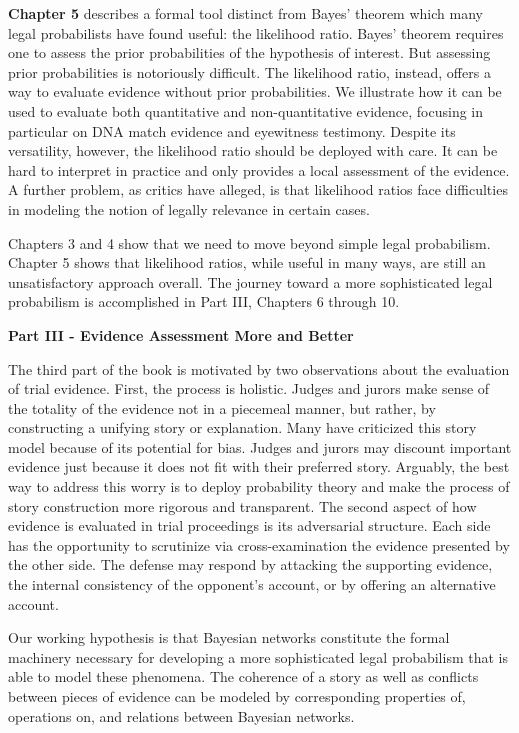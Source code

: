 \documentclass[
  10pt,
  dvipsnames,enabledeprecatedfontcommands]{scrartcl}
\begin{document}
\textbf{Chapter 5} describes a formal tool distinct from Bayes' theorem
which many legal probabilists have found useful: the likelihood ratio.
Bayes' theorem requires one to assess the prior probabilities of the
hypothesis of interest. But assessing prior probabilities is notoriously
difficult. The likelihood ratio, instead, offers a way to evaluate
evidence without prior probabilities. We illustrate how it can be used
to evaluate both quantitative and non-quantitative evidence, focusing in
particular on DNA match evidence and eyewitness testimony. Despite its
versatility, however, the likelihood ratio should be deployed with care.
It can be hard to interpret in practice and only provides a local
assessment of the evidence. A further problem, as critics have alleged,
is that likelihood ratios face difficulties in modeling the notion of
legally relevance in certain cases.

Chapters 3 and 4 show that we need to move beyond simple legal
probabilism. Chapter 5 shows that likelihood ratios, while useful in
many ways, are still an unsatisfactory approach overall. The journey
toward a more sophisticated legal probabilism is accomplished in Part
III, Chapters 6 through 10.

\vspace{3mm}

\noindent \textbf{Part III - Evidence Assessment More and Better}

\noindent The third part of the book is motivated by two observations
about the evaluation of trial evidence. First, the process is holistic.
Judges and jurors make sense of the totality of the evidence not in a
piecemeal manner, but rather, by constructing a unifying story or
explanation. Many have criticized this story model because of its
potential for bias. Judges and jurors may discount important evidence
just because it does not fit with their preferred story. Arguably, the
best way to address this worry is to deploy probability theory and make
the process of story construction more rigorous and transparent. The
second aspect of how evidence is evaluated in trial proceedings is its
adversarial structure. Each side has the opportunity to scrutinize via
cross-examination the evidence presented by the other side. The defense
may respond by attacking the supporting evidence, the internal
consistency of the opponent's account, or by offering an alternative
account.

Our working hypothesis is that Bayesian networks constitute the formal
machinery necessary for developing a more sophisticated legal
probabilism that is able to model these phenomena. The coherence of a
story as well as conflicts between pieces of evidence can be modeled by
corresponding properties of, operations on, and relations between
Bayesian networks.
\end{document}
